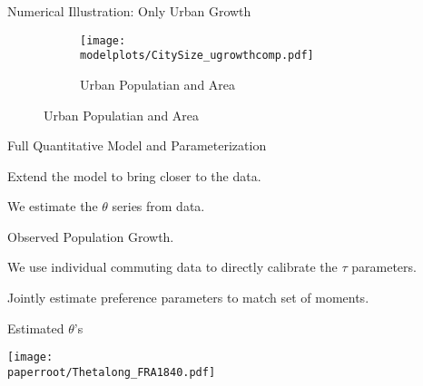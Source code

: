 \documentclass[aspectratio=169]{beamer}
\begin{document}
\begin{v75mins}
\begin{frame}{Numerical Illustration: Only Urban Growth}
	\begin{figure}
		
		\begin{subfigure}[t]{0.32\textwidth}
			\begin{centering}
				\texttt{[image: \\modelplots/CitySize\_ugrowthcomp.pdf]}
				\caption{Urban Populatian and Area}
			\end{centering}
		\end{subfigure}
		\hfill
		\hfill
	\end{figure}
	\end{frame}


\begin{frame}[label=param]{Full Quantitative Model and Parameterization}
	\begin{mide}
		\item Extend the model to bring closer to the data.
		\item We estimate the $\theta$ series from data.
		\item Observed Population Growth.
		\item We use individual commuting data to directly calibrate the $\tau$ parameters. \hyperlink{tau}{}
		\item Jointly estimate preference parameters to match set of moments.
	\end{mide}
\end{frame}

\begin{frame}{Estimated $\theta$'s}
	\begin{adjustbox}{center}
		\texttt{[image: \\paperroot/Thetalong\_FRA1840.pdf]}

	\end{adjustbox}
\end{frame}


\end{v75mins}
\end{document}
